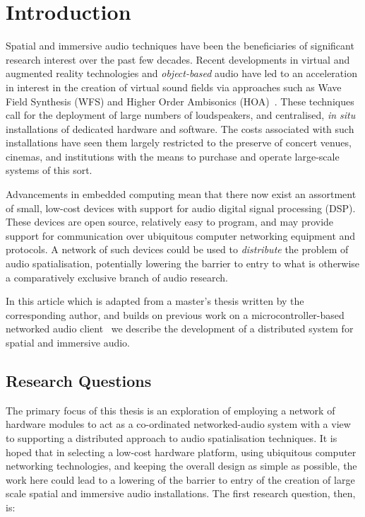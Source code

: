 \section{Introduction}\label{sec:introduction}

Spatial and immersive audio techniques have been the beneficiaries of
significant research interest over the past few decades.
Recent developments in virtual and augmented reality technologies and
\textit{object-based} audio have led to an acceleration in interest in the
creation of virtual sound fields via approaches such as Wave Field Synthesis
(WFS) and Higher Order Ambisonics (HOA)~\citep{berkhout_acoustic_1993,
    ahrens_theory_2008,daniel_further_2003,frank_producing_2015}.
These techniques call for the deployment of large numbers of loudspeakers, and
centralised, \textit{in situ} installations of dedicated hardware and software.
The costs associated with such installations have seen them largely restricted
to the preserve of concert venues, cinemas, and institutions with the means to
purchase and operate large-scale systems of this sort.

Advancements in embedded computing mean that there now exist an assortment of
small, low-cost devices with support for audio digital signal processing (DSP).
These devices are open source, relatively easy to program, and may provide
support for communication over ubiquitous computer networking equipment and
protocols.
A network of such devices could be used to \textit{distribute} the problem of
audio spatialisation, potentially lowering the barrier to entry to what is
otherwise a comparatively exclusive branch of audio research.

In this article \textemdash{} which is adapted from a master's thesis written by
the corresponding author, and builds on previous work on a microcontroller-based
networked audio client~\citep{rushton_microcontroller-based_2023} \textemdash{}
we describe the development of a distributed system for spatial and immersive
audio.






\subsection{Research Questions}\label{subsec:research-questions}

The primary focus of this thesis is an exploration of employing a
network of hardware modules to act as a co-ordinated networked-audio system
with a view to supporting a distributed approach to audio spatialisation
techniques.
It is hoped that in selecting a low-cost hardware platform, using ubiquitous
computer networking technologies, and keeping the overall design as simple as
possible, the work here could lead to a lowering of the barrier to entry of
the creation of large scale spatial and immersive audio installations.
The first research question, then, is:

